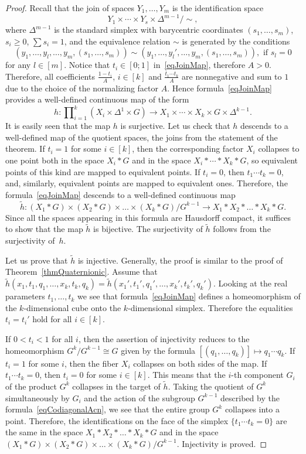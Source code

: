 \documentclass[english, 12pt]{amsproc}
\numberwithin{equation}{section}
\theoremstyle{plain}
\theoremstyle{definition}
\theoremstyle{remark}
\newcommand{\simc}{\!\!\sim}
\newcommand{\hh}{\tilde{h}}
\begin{document}
\begin{proof}
Recall that the join of spaces $Y_1,\ldots,Y_m$ is the identification space
\[
Y_1\times\cdots\times Y_s\times \Delta^{m-1}/\simc,
\]
where $\Delta^{m-1}$ is the standard simplex with barycentric coordinates $(s_1,\ldots,s_m)$, $s_i\geqslant 0$, $\sum s_i=1$, and the equivalence relation $\sim$ is generated by the conditions
\[
(y_1,\ldots,y_l,\ldots,y_m,(s_1,\ldots,s_m))\sim (y_1,\ldots,y_l',\ldots,y_m,(s_1,\ldots,s_m)), \text{ if }s_l=0
\]
for any $l\in[m]$. Notice that $t_i\in[0;1]$ in~\eqref{eqJoinMap}, therefore $A>0$. Therefore, all coefficients $\frac{1-t_i}{A}$, $i\in[k]$ and $\frac{t_1\cdots t_k}{A}$ are nonnegative and sum to $1$ due to the choice of the normalizing factor $A$. Hence formula~\eqref{eqJoinMap} provides a well-defined continuous map of the form
\[
h\colon\prod\nolimits_{i=1}^{k}(X_i\times \Delta^1\times G)\to X_1\times\cdots\times X_k\times G\times \Delta^{k-1}.
\]
It is easily seen that the map $h$ is surjective. Let us check that $h$ descends to a well-defined map of the quotient spaces, the joins from the statement of the theorem. If $t_i=1$ for some $i\in[k]$, then the corresponding factor $X_i$ collapses to one point both in the space $X_i\ast G$ and in the space $X_i\ast\cdots \ast X_k\ast G$, so equivalent points of this kind are mapped to equivalent points. If $t_i=0$, then $t_1\cdots t_k=0$, and, similarly, equivalent points are mapped to equivalent ones. Therefore, the formula~\eqref{eqJoinMap} descends to a well-defined continuous map
\[
\hh\colon (X_1\ast G)\times (X_2\ast G)\times \ldots \times (X_k\ast G)/G^{k-1} \to X_1\ast X_2\ast \ldots\ast X_k\ast G.
\]
Since all the spaces appearing in this formula are Hausdorff compact, it suffices to show that the map $\hh$ is bijective. The surjectivity of $\hh$ follows from the surjectivity of~$h$.

Let us prove that $\hh$ is injective. Generally, the proof is similar to the proof of Theorem~\ref{thmQuaternionic}. Assume that
$\hh(x_1,t_1,q_1,\ldots,x_k,t_k,q_k) = \hh(x_1',t_1', q_1',\ldots, x_k',t_k',q_k')$. Looking at the real parameters $t_1,\ldots,t_k$ we see that formula~\eqref{eqJoinMap} defines a homeomorphism of the $k$-dimensional cube onto the $k$-dimensional simplex. Therefore the equalities $t_i=t_i'$ hold for all $i\in[k]$.

If $0<t_i<1$ for all $i$, then the assertion of injectivity reduces to the homeomorphism $G^k/G^{k-1}\cong G$ given by the formula $[(q_1,\ldots,q_k)]\mapsto q_1\cdots q_k$. If $t_i=1$ for some $i$, then the fiber $X_i$ collapses on both sides of the map. If $t_1\cdots t_k=0$, then $t_i=0$ for some $i\in[k]$. This means that the $i$-th component $G_i$ of the product $G^k$ collapses in the target of $\hh$. Taking the quotient of $G^k$ simultaneously by $G_i$ and the action of the subgroup $G^{k-1}$ described by the formula~\eqref{eqCodiagonalAcn}, we see that the entire group $G^k$ collapses into a point. Therefore, the identifications on the face of the simplex $\{t_1\cdots t_k=0\}$ are the same in the space $X_1\ast X_2\ast \ldots\ast X_k\ast G$ and in the space $(X_1\ast G)\times (X_2\ast G)\times \ldots \times (X_k\ast G)/G^{k-1}$. Injectivity is proved.
\end{proof}
\end{document}
